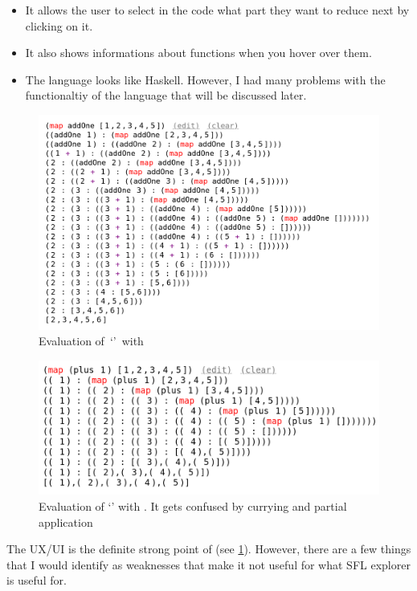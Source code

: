 \begin{itemize}
    \item It allows the user to select in the code what part they want to reduce next by clicking on it. 
    \item It also shows informations about functions when you hover over them. 
    \item The language looks like Haskell. However, I had many problems with the functionaltiy of the language that will be discussed later. 
\end{itemize}


\begin{figure}[t]
    \centering
    \includegraphics[width=0.75\linewidth]{images/LLessonsMap.png}
    \caption{Evaluation of\ `'\ with \llessons}
    \label{bg:llessons_ui}
\end{figure}

\begin{figure}[t]
    \centering
    \includegraphics[width=0.75\linewidth]{images/LLessonsGoingWrong.png}
    \caption{Evaluation of `' with \llessons. It gets confused by currying and partial application}
    \label{bg:llessons_gets_confused}
\end{figure}

The UX/UI is the definite strong point of \llessons (see \ref{bg:llessons_ui}).  However, there are a few things that I would identify as weaknesses that make it not useful for what SFL explorer is useful for. 

